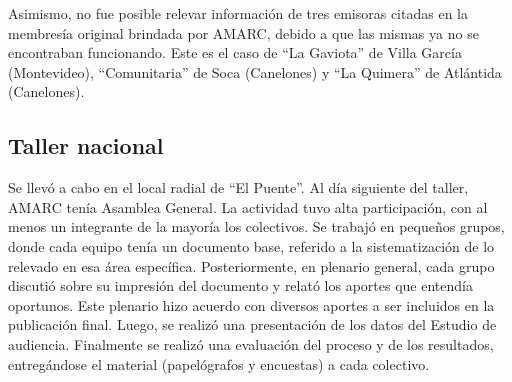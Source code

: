 Asimismo, no fue posible relevar información de tres emisoras citadas en la membresía original brindada por AMARC, debido a que las mismas ya no se encontraban funcionando. Este es el caso de “La Gaviota” de Villa García (Montevideo), “Comunitaria” de Soca (Canelones) y “La Quimera” de Atlántida (Canelones).\\

\subsection{Taller nacional}

Se llevó a cabo en el local radial de “El Puente”. Al día siguiente del taller, AMARC tenía Asamblea General. La actividad tuvo alta participación, con al menos un integrante de la mayoría los colectivos. Se trabajó en pequeños grupos, donde cada equipo tenía un documento base, referido a la sistematización de lo relevado en esa área específica. Posteriormente, en plenario general, cada grupo discutió sobre su impresión del documento y relató los aportes que entendía oportunos. Este plenario hizo acuerdo con diversos aportes a ser incluidos en la publicación final. Luego, se realizó una presentación de los datos del Estudio de audiencia. Finalmente se realizó una evaluación del proceso y de los resultados, entregándose el material (papelógrafos y encuestas) a cada colectivo.